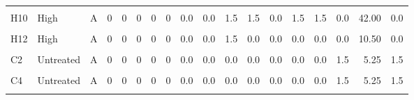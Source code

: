 \documentclass[12pt,final,CPage]{ufthesis}
\begin{document}
{\begin{table}
{\begin{tabular}[t]{lllrrrrrrrrrrrrrrr}
  \cellcolor{gray!6}{H9} & \cellcolor{gray!6}{High} & \cellcolor{gray!6}{S} & \cellcolor{gray!6}{0} & \cellcolor{gray!6}{0} & \cellcolor{gray!6}{0} & \cellcolor{gray!6}{0} & \cellcolor{gray!6}{0} & \cellcolor{gray!6}{0.0} & \cellcolor{gray!6}{0.0} & \cellcolor{gray!6}{0.0} & \cellcolor{gray!6}{1.5} & \cellcolor{gray!6}{1.5} & \cellcolor{gray!6}{1.5} & \cellcolor{gray!6}{1.5} & \cellcolor{gray!6}{17.5} & \cellcolor{gray!6}{103.25} & \cellcolor{gray!6}{17.5}\\
  H10 & High & A & 0 & 0 & 0 & 0 & 0 & 0.0 & 0.0 & 1.5 & 1.5 & 0.0 & 1.5 & 1.5 & 0.0 & 42.00 & 0.0\\
  \cellcolor{gray!6}{H11} & \cellcolor{gray!6}{High} & \cellcolor{gray!6}{A} & \cellcolor{gray!6}{0} & \cellcolor{gray!6}{0} & \cellcolor{gray!6}{0} & \cellcolor{gray!6}{0} & \cellcolor{gray!6}{0} & \cellcolor{gray!6}{0.0} & \cellcolor{gray!6}{0.0} & \cellcolor{gray!6}{0.0} & \cellcolor{gray!6}{0.0} & \cellcolor{gray!6}{0.0} & \cellcolor{gray!6}{0.0} & \cellcolor{gray!6}{0.0} & \cellcolor{gray!6}{1.5} & \cellcolor{gray!6}{5.25} & \cellcolor{gray!6}{1.5}\\
  \addlinespace
  H12 & High & A & 0 & 0 & 0 & 0 & 0 & 0.0 & 0.0 & 1.5 & 0.0 & 0.0 & 0.0 & 0.0 & 0.0 & 10.50 & 0.0\\
  \cellcolor{gray!6}{C1} & \cellcolor{gray!6}{Untreated} & \cellcolor{gray!6}{A} & \cellcolor{gray!6}{0} & \cellcolor{gray!6}{0} & \cellcolor{gray!6}{0} & \cellcolor{gray!6}{0} & \cellcolor{gray!6}{0} & \cellcolor{gray!6}{0.0} & \cellcolor{gray!6}{0.0} & \cellcolor{gray!6}{0.0} & \cellcolor{gray!6}{0.0} & \cellcolor{gray!6}{0.0} & \cellcolor{gray!6}{0.0} & \cellcolor{gray!6}{0.0} & \cellcolor{gray!6}{0.0} & \cellcolor{gray!6}{0.00} & \cellcolor{gray!6}{0.0}\\
  C2 & Untreated & A & 0 & 0 & 0 & 0 & 0 & 0.0 & 0.0 & 0.0 & 0.0 & 0.0 & 0.0 & 0.0 & 1.5 & 5.25 & 1.5\\
  \cellcolor{gray!6}{C3} & \cellcolor{gray!6}{Untreated} & \cellcolor{gray!6}{A} & \cellcolor{gray!6}{0} & \cellcolor{gray!6}{0} & \cellcolor{gray!6}{0} & \cellcolor{gray!6}{0} & \cellcolor{gray!6}{0} & \cellcolor{gray!6}{0.0} & \cellcolor{gray!6}{0.0} & \cellcolor{gray!6}{0.0} & \cellcolor{gray!6}{0.0} & \cellcolor{gray!6}{0.0} & \cellcolor{gray!6}{0.0} & \cellcolor{gray!6}{0.0} & \cellcolor{gray!6}{0.0} & \cellcolor{gray!6}{0.00} & \cellcolor{gray!6}{0.0}\\
  C4 & Untreated & A & 0 & 0 & 0 & 0 & 0 & 0.0 & 0.0 & 0.0 & 0.0 & 0.0 & 0.0 & 0.0 & 1.5 & 5.25 & 1.5\\
  \addlinespace

\end{tabular}}
\end{table}}
\end{document}
